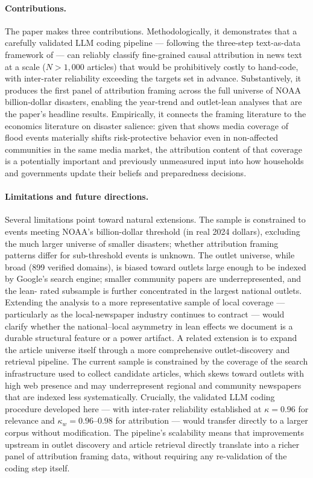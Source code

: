 \documentclass[12pt]{article}
\begin{document}
\paragraph{Contributions.}  The paper makes three contributions.
Methodologically, it demonstrates that a carefully validated LLM coding
pipeline --- following the three-step text-as-data framework of
\citet{gentzkow2019} --- can reliably classify fine-grained causal
attribution in news text at a scale ($N > 1{,}000$ articles) that
would be prohibitively costly to hand-code, with inter-rater reliability
exceeding the targets set in advance.  Substantively, it produces the
first panel of attribution framing across the full universe of
NOAA billion-dollar disasters, enabling the year-trend and outlet-lean
analyses that are the paper's headline results.  Empirically, it
connects the framing literature to the economics literature on disaster
salience: given that \citet{gallagher2014} shows media coverage of
flood events materially shifts risk-protective behavior even in
non-affected communities in the same media market, the attribution
content of that coverage is a potentially important and previously
unmeasured input into how households and governments update their
beliefs and preparedness decisions.

\paragraph{Limitations and future directions.}  Several limitations
point toward natural extensions.  The sample is constrained to events
meeting NOAA's billion-dollar threshold (in real 2024 dollars),
excluding the much larger universe of smaller disasters; whether
attribution framing patterns differ for sub-threshold events is
unknown.  The outlet universe, while broad (899 verified domains), is
biased toward outlets large enough to be indexed by Google's search
engine; smaller community papers are underrepresented, and the lean-
rated subsample is further concentrated in the largest national outlets.
Extending the analysis to a more representative sample of local
coverage --- particularly as the local-newspaper industry continues to
contract \citep{ellger2024} --- would clarify whether the
national--local asymmetry in lean effects we document is a durable
structural feature or a power artifact.  A related extension is to
expand the article universe itself through a more comprehensive
outlet-discovery and retrieval pipeline.  The current sample is
constrained by the coverage of the search infrastructure used to
collect candidate articles, which skews toward outlets with high web
presence and may underrepresent regional and community newspapers that
are indexed less systematically.  Crucially, the validated LLM coding
procedure developed here --- with inter-rater reliability established
at $\kappa = 0.96$ for relevance and $\kappa_w = 0.96$--$0.98$ for
attribution --- would transfer directly to a larger corpus without
modification.  The pipeline's scalability means that improvements
upstream in outlet discovery and article retrieval directly translate
into a richer panel of attribution framing data, without requiring any
re-validation of the coding step itself.
\end{document}
